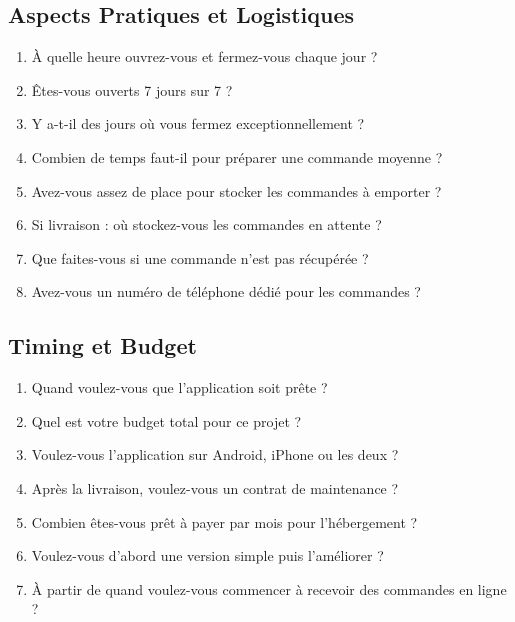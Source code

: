 \documentclass[11pt,a4paper]{article}
\begin{document}
\subsection{Aspects Pratiques et Logistiques}

\begin{enumerate}[resume]
    \item À quelle heure ouvrez-vous et fermez-vous chaque jour ?
    \item Êtes-vous ouverts 7 jours sur 7 ?
    \item Y a-t-il des jours où vous fermez exceptionnellement ?
    \item Combien de temps faut-il pour préparer une commande moyenne ?
    \item Avez-vous assez de place pour stocker les commandes à emporter ?
    \item Si livraison : où stockez-vous les commandes en attente ?
    \item Que faites-vous si une commande n'est pas récupérée ?
    \item Avez-vous un numéro de téléphone dédié pour les commandes ?
\end{enumerate}

\subsection{Timing et Budget}

\begin{enumerate}[resume]
    \item Quand voulez-vous que l'application soit prête ?
    \item Quel est votre budget total pour ce projet ?
    \item Voulez-vous l'application sur Android, iPhone ou les deux ?
    \item Après la livraison, voulez-vous un contrat de maintenance ?
    \item Combien êtes-vous prêt à payer par mois pour l'hébergement ?
    \item Voulez-vous d'abord une version simple puis l'améliorer ?
    \item À partir de quand voulez-vous commencer à recevoir des commandes en ligne ?
\end{enumerate}

\end{document}
